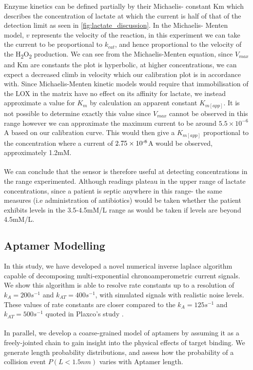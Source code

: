Enzyme kinetics can be defined partially by their Michaelis- constant Km which describes the concentration of lactate at which the current is half of that of the detection limit as seen in \autoref{fig:lactate_discussion}. In the Michaelis- Menten model, $v$ represents the velocity of the reaction, in this experiment we can take the current to be proportional to $k_{cat}$, and hence proportional to the velocity of the H\textsubscript{2}O\textsubscript{2} production. We can see from the Michaelis-Menten equation, since $V_{max}$ and Km are constants the plot is hyperbolic, at higher concentrations, we can expect a decreased climb in velocity which our calibration plot is in accordance with. Since Michaelis-Menten kinetic models would require that immobilisation of the LOX in the matrix have no effect on its affinity for lactate, we instead approximate a value for $K_{m}$ by calculation an apparent constant $K_{m[app]}$.  It is not possible to determine exactly this value since $V_{max}$ cannot be observed in this range however we can approximate the maximum current to be around $5.5\times10^{-6}$ A based on our calibration curve. This would then give a $K_{m[app]}$ proportional to the concentration where a current of $2.75\times 10\textsuperscript{-6}$A would be observed, approximately 1.2mM.\\\\
We can conclude that the sensor is therefore useful at detecting concentrations in the range experimented. Although readings plateau in the upper range of lactate concentrations, since a patient is septic anywhere in this range- the same measures (i.e administration of antibiotics) would be taken whether the patient exhibits levels in the 3.5-4.5mM/L range as would be taken if levels are beyond 4.5mM/L.  
\subsection{Aptamer Modelling}
In this study, we have developed a novel numerical inverse laplace algorithm capable of decomposing multi-exponential chronoamperometric current signals. We show this algorithm is able to resolve rate constants up to a resolution of $k_{A} = 200s^{-1}$ and $k_{AT} = 400s^{-1}$, with simulated signals with realistic noise levels. These values of rate constants are closer compared to the $k_{A} = 125s^{-1}$ and $k_{AT} = 500s^{-1}$ quoted in Plaxco's study \cite{arroyo2018subsecond}.\\\\
In parallel, we develop a coarse-grained model of aptamers by assuming it as a freely-jointed chain to gain insight into the physical effects of target binding. We generate length probability distributions, and assess how the probability of a collision event $P(L<1.5nm)$ varies with Aptamer length.\\\\
